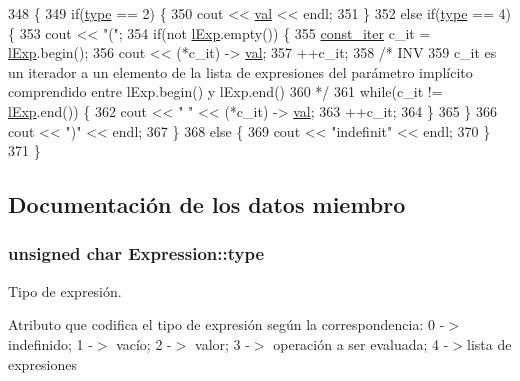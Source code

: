 \begin{DoxyCode}
348 \{
349   \textcolor{keywordflow}{if}(\hyperlink{class_expression_a2c094b93c4863b1f851ea2136aae9612}{type} == 2) \{
350     cout << \hyperlink{class_expression_a9c15b529b5d59e6bffb3855e384c04aa}{val} << endl;
351   \}
352   \textcolor{keywordflow}{else} \textcolor{keywordflow}{if}(\hyperlink{class_expression_a2c094b93c4863b1f851ea2136aae9612}{type} == 4) \{
353     cout << \textcolor{stringliteral}{"("};
354     \textcolor{keywordflow}{if}(not \hyperlink{class_expression_afb4f4617291f7e182cbf2252151b122a}{lExp}.empty()) \{
355       \hyperlink{_expression_8cc_a6ff59711533978050143f1bfb54c33b1}{const\_iter} c\_it = \hyperlink{class_expression_afb4f4617291f7e182cbf2252151b122a}{lExp}.begin();
356       cout << (*c\_it) -> \hyperlink{class_expression_a9c15b529b5d59e6bffb3855e384c04aa}{val};
357       ++c\_it;
358       \textcolor{comment}{/* INV}
359 \textcolor{comment}{        c\_it es un iterador a un elemento de la lista de expresiones del parámetro implícito comprendido
       entre lExp.begin() y lExp.end()}
360 \textcolor{comment}{      */}
361       \textcolor{keywordflow}{while}(c\_it != \hyperlink{class_expression_afb4f4617291f7e182cbf2252151b122a}{lExp}.end()) \{
362         cout << \textcolor{stringliteral}{" "} << (*c\_it) -> \hyperlink{class_expression_a9c15b529b5d59e6bffb3855e384c04aa}{val};
363         ++c\_it;
364       \}
365     \}
366     cout << \textcolor{stringliteral}{")"} << endl;
367   \}
368   \textcolor{keywordflow}{else} \{
369     cout << \textcolor{stringliteral}{"indefinit"} << endl;
370   \}
371 \}
\end{DoxyCode}


\subsection{Documentación de los datos miembro}
\subsubsection[{\texorpdfstring{type}{type}}]{\setlength{\rightskip}{0pt plus 5cm}unsigned char Expression\+::type\hspace{0.3cm}{\ttfamily [private]}}\hypertarget{class_expression_a2c094b93c4863b1f851ea2136aae9612}{}\label{class_expression_a2c094b93c4863b1f851ea2136aae9612}


Tipo de expresión. 

Atributo que codifica el tipo de expresión según la correspondencia\+: 0 -\/$>$ indefinido; 1 -\/$>$ vacío; 2 -\/$>$ valor; 3 -\/$>$ operación a ser evaluada; 4 -\/$>$lista de expresiones 

